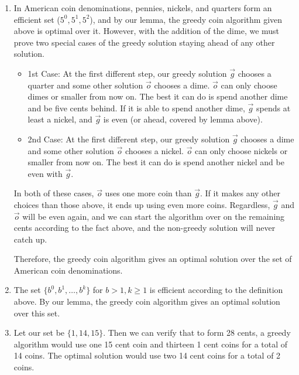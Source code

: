 \documentclass[12pt]{article}
\begin{document}

\pagebreak

\begin{enumerate}

\item

In American coin denominations, pennies, nickels, and quarters form an
efficient set ($5^0, 5^1, 5^2$), and by our lemma, the greedy coin
algorithm given above is optimal over it.
However, with the addition of the dime,
we must prove two special cases of the greedy solution staying ahead of
any other solution.

\begin{itemize}
\item
1st Case: At the first different step, our greedy solution $\vec{g}$ chooses a quarter and some other
solution $\vec{o}$ chooses a dime. $\vec{o}$ can only choose dimes or
smaller from now on. The best it can do is spend another dime and be
five cents behind. If it is able to spend another dime, $\vec{g}$ spends
at least a nickel, and $\vec{g}$ is even (or ahead, covered by
lemma above).
\item
2nd Case: At the first different step, our greedy solution $\vec{g}$ chooses a dime and some other
solution $\vec{o}$ chooses a nickel. $\vec{o}$ can only choose nickels
or smaller from now on. The best it can do is spend another nickel and
be even with $\vec{g}$.
\end{itemize}

In both of these cases, $\vec{o}$ uses one more coin than $\vec{g}$.
If it makes any
other choices than those above, it ends up using even more coins.
Regardless, $\vec{g}$ and $\vec{o}$ will be even again,
and we can start the algorithm over on the remaining cents according to
the fact above, and the non-greedy solution will never catch up.

Therefore, the greedy coin
algorithm gives an optimal solution over the set of American coin
denominations.

\item
The set $\{b^0, b^1,\ldots , b^k\}$ for $b > 1, k \ge 1$ is efficient
according to the definition above.
By our lemma, the greedy coin algorithm gives an optimal
solution over this set.

\item
Let our set be $\{1, 14, 15\}$. Then we can verify that
to form 28 cents, a greedy algorithm would use one 15 cent coin and
thirteen 1 cent coins for a total of 14 coins. The optimal solution would
use two 14 cent coins for a total of 2 coins.

\end{enumerate}
\end{document}
